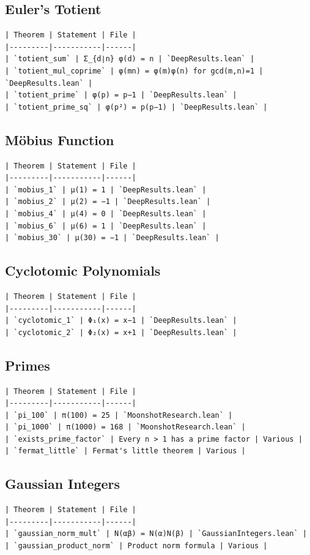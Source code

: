 \documentclass[12pt,a4paper,openany]{book}
\begin{document}
\subsection{Euler's Totient}
\begin{verbatim}
| Theorem | Statement | File |
|---------|-----------|------|
| `totient_sum` | Σ_{d∣n} φ(d) = n | `DeepResults.lean` |
| `totient_mul_coprime` | φ(mn) = φ(m)φ(n) for gcd(m,n)=1 | `DeepResults.lean` |
| `totient_prime` | φ(p) = p−1 | `DeepResults.lean` |
| `totient_prime_sq` | φ(p²) = p(p−1) | `DeepResults.lean` |
\end{verbatim}

\subsection{Möbius Function}
\begin{verbatim}
| Theorem | Statement | File |
|---------|-----------|------|
| `mobius_1` | μ(1) = 1 | `DeepResults.lean` |
| `mobius_2` | μ(2) = −1 | `DeepResults.lean` |
| `mobius_4` | μ(4) = 0 | `DeepResults.lean` |
| `mobius_6` | μ(6) = 1 | `DeepResults.lean` |
| `mobius_30` | μ(30) = −1 | `DeepResults.lean` |
\end{verbatim}

\subsection{Cyclotomic Polynomials}
\begin{verbatim}
| Theorem | Statement | File |
|---------|-----------|------|
| `cyclotomic_1` | Φ₁(x) = x−1 | `DeepResults.lean` |
| `cyclotomic_2` | Φ₂(x) = x+1 | `DeepResults.lean` |
\end{verbatim}

\subsection{Primes}
\begin{verbatim}
| Theorem | Statement | File |
|---------|-----------|------|
| `pi_100` | π(100) = 25 | `MoonshotResearch.lean` |
| `pi_1000` | π(1000) = 168 | `MoonshotResearch.lean` |
| `exists_prime_factor` | Every n > 1 has a prime factor | Various |
| `fermat_little` | Fermat's little theorem | Various |
\end{verbatim}

\subsection{Gaussian Integers}
\begin{verbatim}
| Theorem | Statement | File |
|---------|-----------|------|
| `gaussian_norm_mult` | N(αβ) = N(α)N(β) | `GaussianIntegers.lean` |
| `gaussian_product_norm` | Product norm formula | Various |
\end{verbatim}
\end{document}
